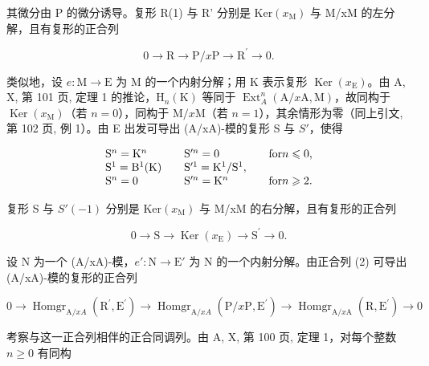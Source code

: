 其微分由 P 的微分诱导。复形 R(1) 与 R' 分别是 \(\mathrm{Ker}(x_{\mathrm{M}})\) 与 M/xM 的左分解，且有复形的正合列

\[
0 \rightarrow \mathrm{R} \longrightarrow \mathrm{P} / x \mathrm{P} \longrightarrow \mathrm{R} ^ {\prime} \longrightarrow 0.\tag{2}
\]

类似地，设 \(e: \mathrm{M} \to \mathrm{E}\) 为 M 的一个内射分解；用 K 表示复形 \(\operatorname{Ker}(x_{\mathrm{E}})\)。由 A, X, 第 101 页, 定理 1 的推论，\(\mathrm{H}_n(\mathrm{K})\) 等同于 \(\operatorname{Ext}_A^n (\mathrm{A} / x\mathrm{A},\mathrm{M})\)，故同构于 \(\operatorname{Ker}(x_{\mathrm{M}})\)（若 \(n = 0\)），同构于 \(\mathrm{M} / x\mathrm{M}\)（若 \(n = 1\)），其余情形为零（同上引文, 第 102 页, 例 1）。由 E 出发可导出 (A/xA)-模的复形 S 与 \(S'\)，使得

\[
\begin{array}{l l l} \mathrm{S} ^ {n} = \mathrm{K} ^ {n} & \quad \mathrm{S} ^ {\prime n} = 0 & \quad \text {for} n \leqslant 0, \\ \mathrm{S} ^ {1} = \mathrm{B} ^ {1} (\mathrm{K}) & \quad \mathrm{S} ^ {\prime 1} = \mathrm{K} ^ {1} / \mathrm{S} ^ {1}, \\ \mathrm{S} ^ {n} = 0 & \quad \mathrm{S} ^ {\prime n} = \mathrm{K} ^ {n} & \quad \text {for} n \geqslant 2. \end{array}
\]

复形 S 与 \(S'(-1)\) 分别是 \(\mathrm{Ker}(x_{\mathrm{M}})\) 与 M/xM 的右分解，且有复形的正合列

\[
0 \to \mathrm{S} \longrightarrow \operatorname{Ker} (x _ {\mathrm{E}}) \longrightarrow \mathrm{S} ^ {\prime} \to 0.\tag{3}
\]

设 N 为一个 (A/xA)-模，\(e': \mathrm{N} \to \mathrm{E}'\) 为 N 的一个内射分解。由正合列 (2) 可导出 (A/xA)-模的复形的正合列

\[
0 \to \operatorname{Homgr} _ {\mathrm{A} / x A} \left(\mathrm{R} ^ {\prime}, \mathrm{E} ^ {\prime}\right) \longrightarrow \operatorname{Homgr} _ {\mathrm{A} / x A} \left(\mathrm{P} / x \mathrm{P}, \mathrm{E} ^ {\prime}\right) \longrightarrow \operatorname{Homgr} _ {\mathrm{A} / x \mathrm{A}} \left(\mathrm{R}, \mathrm{E} ^ {\prime}\right)\rightarrow 0
\]

考察与这一正合列相伴的正合同调列。由 A, X, 第 100 页, 定理 1，对每个整数 \(n \geqslant 0\) 有同构

